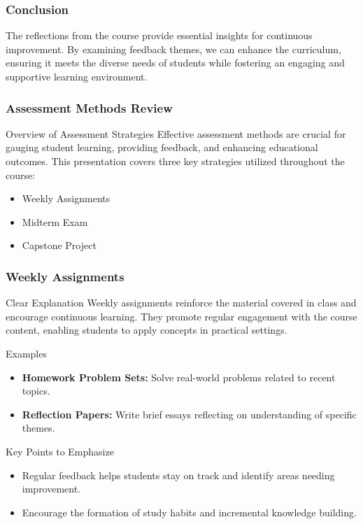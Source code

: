 \documentclass{beamer}
\begin{document}
\begin{frame}[fragile]
    \frametitle{Conclusion}
    The reflections from the course provide essential insights for continuous improvement. By examining feedback themes, we can enhance the curriculum, ensuring it meets the diverse needs of students while fostering an engaging and supportive learning environment.
\end{frame}

\begin{frame}[fragile]
    \frametitle{Assessment Methods Review}
    \begin{block}{Overview of Assessment Strategies}
        Effective assessment methods are crucial for gauging student learning, providing feedback, and enhancing educational outcomes. This presentation covers three key strategies utilized throughout the course:
        \begin{itemize}
            \item Weekly Assignments
            \item Midterm Exam
            \item Capstone Project
        \end{itemize}
    \end{block}
\end{frame}

\begin{frame}[fragile]
    \frametitle{Weekly Assignments}
    \begin{block}{Clear Explanation}
        Weekly assignments reinforce the material covered in class and encourage continuous learning. They promote regular engagement with the course content, enabling students to apply concepts in practical settings.
    \end{block}

    \begin{block}{Examples}
        \begin{itemize}
            \item \textbf{Homework Problem Sets:} Solve real-world problems related to recent topics.
            \item \textbf{Reflection Papers:} Write brief essays reflecting on understanding of specific themes.
        \end{itemize}
    \end{block}

    \begin{block}{Key Points to Emphasize}
        \begin{itemize}
            \item Regular feedback helps students stay on track and identify areas needing improvement.
            \item Encourage the formation of study habits and incremental knowledge building.
        \end{itemize}
    \end{block}
\end{frame}
\end{document}
